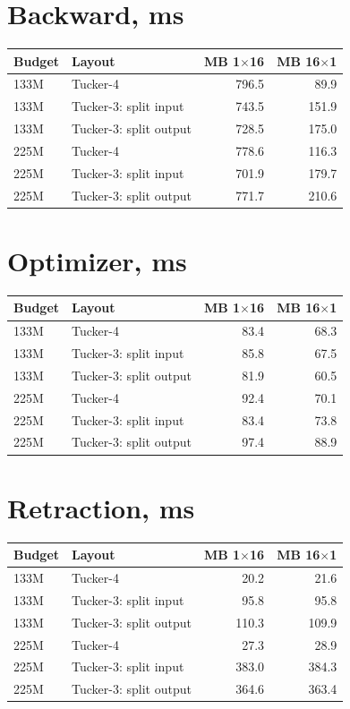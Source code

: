 \documentclass[10pt]{article}
\begin{document}
\section{Backward, ms}
\begin{center}
\small
\begin{tabular}{llrr}
\toprule
\textbf{Budget} & \textbf{Layout} & \textbf{MB 1$\times$16} & \textbf{MB 16$\times$1} \\
\midrule
133M & Tucker-4 & 796.5 & 89.9 \\
133M & Tucker-3: split input & 743.5 & 151.9 \\
133M & Tucker-3: split output & 728.5 & 175.0 \\
225M & Tucker-4 & 778.6 & 116.3 \\
225M & Tucker-3: split input & 701.9 & 179.7 \\
225M & Tucker-3: split output & 771.7 & 210.6 \\
\bottomrule
\end{tabular}
\end{center}
\section{Optimizer, ms}
\begin{center}
\small
\begin{tabular}{llrr}
\toprule
\textbf{Budget} & \textbf{Layout} & \textbf{MB 1$\times$16} & \textbf{MB 16$\times$1} \\
\midrule
133M & Tucker-4 & 83.4 & 68.3 \\
133M & Tucker-3: split input & 85.8 & 67.5 \\
133M & Tucker-3: split output & 81.9 & 60.5 \\
225M & Tucker-4 & 92.4 & 70.1 \\
225M & Tucker-3: split input & 83.4 & 73.8 \\
225M & Tucker-3: split output & 97.4 & 88.9 \\
\bottomrule
\end{tabular}
\end{center}
\section{Retraction, ms}
\begin{center}
\small
\begin{tabular}{llrr}
\toprule
\textbf{Budget} & \textbf{Layout} & \textbf{MB 1$\times$16} & \textbf{MB 16$\times$1} \\
\midrule
133M & Tucker-4 & 20.2 & 21.6 \\
133M & Tucker-3: split input & 95.8 & 95.8 \\
133M & Tucker-3: split output & 110.3 & 109.9 \\
225M & Tucker-4 & 27.3 & 28.9 \\
225M & Tucker-3: split input & 383.0 & 384.3 \\
225M & Tucker-3: split output & 364.6 & 363.4 \\
\bottomrule
\end{tabular}
\end{center}
\end{document}
